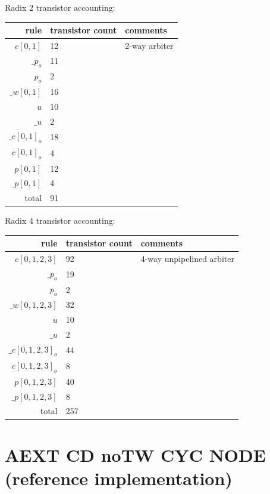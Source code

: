\documentclass{article}
\begin{document}
\noindent
Radix 2 transistor accounting:

\begin{center}
    \begin{tabular}{|r|l|l|}
    \hline
    rule & transistor count & comments \\ \hline
    $c[0,1]$ & 12 & 2-way arbiter \\ \hline
    $\_p_o$ & 11 & \\ \hline
    $p_o$ & 2 & \\ \hline
    $\_w[0,1]$ & 16 & \\ \hline
    $u$ & 10 & \\ \hline
    $\_u$ & 2 & \\ \hline
    $\_c[0,1]_o$ & 18 & \\ \hline
    $c[0,1]_o$ & 4 & \\ \hline
    $p[0,1]$ & 12 & \\ \hline
    $\_p[0,1]$ & 4 & \\ \hline
    \hline total & 91 & \\ \hline
    \end{tabular}
\end{center}

\noindent
Radix 4 transistor accounting:

\begin{center}
    \begin{tabular}{|r|l|l|}
    \hline
    rule & transistor count & comments \\ \hline
    $c[0,1,2,3]$ & 92 & 4-way unpipelined arbiter \\ \hline
    $\_p_o$ & 19 & \\ \hline
    $p_o$ & 2 & \\ \hline
    $\_w[0,1,2,3]$ & 32 & \\ \hline
    $u$ & 10 & \\ \hline
    $\_u$ & 2 & \\ \hline
    $\_c[0,1,2,3]_o$ & 44 & \\ \hline
    $c[0,1,2,3]_o$ & 8 & \\ \hline
    $p[0,1,2,3]$ & 40 & \\ \hline
    $\_p[0,1,2,3]$ & 8 & \\ \hline
    \hline total & 257 & \\ \hline
    \end{tabular}
\end{center}

\section{AEXT CD noTW CYC NODE (reference implementation) \label{sec:AEXT_CD_noTW_CYC_NODE(ref)}}
\end{document}
